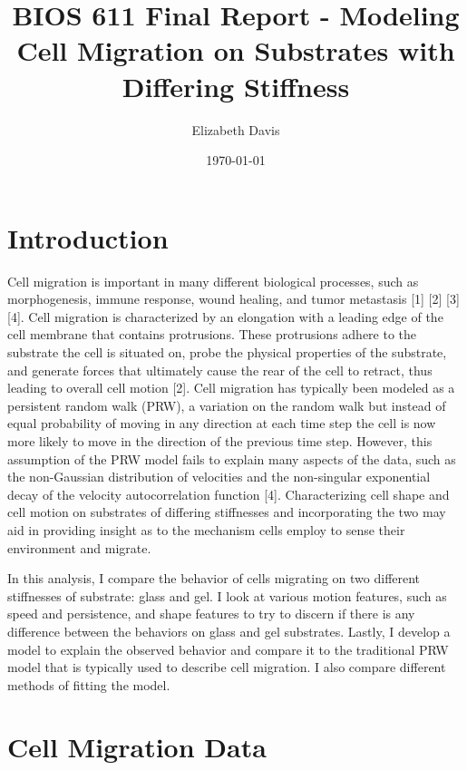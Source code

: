 \documentclass[12pt]{article}
\title{BIOS 611 Final Report - Modeling Cell Migration on Substrates with Differing Stiffness}
\author{Elizabeth Davis}
\date{\today}
\begin{document}
\maketitle

\section{Introduction}

Cell migration is important in many different biological processes, such as morphogenesis, immune response, wound healing, and tumor 
metastasis [1] [2] [3] [4]. 
Cell migration is characterized by an elongation with a leading edge of the cell membrane that contains protrusions. These protrusions
adhere to the substrate the cell is situated on, probe the physical properties of the substrate, and generate forces that ultimately cause 
the rear of the cell to retract, thus leading to overall cell motion [2]. Cell migration has typically been modeled as a persistent 
random walk (PRW), a variation on the random walk but instead of equal probability of moving in any direction at each time step the cell is now more likely to move in the direction of the previous time step.
However, this assumption of the PRW model fails to explain many aspects of the data, such as the non-Gaussian distribution of velocities and the non-singular exponential decay
of the velocity autocorrelation function [4]. Characterizing cell shape and cell motion on substrates of differing stiffnesses and incorporating the two may aid 
in providing insight as to the mechanism cells employ to sense their environment and migrate.

In this analysis, I compare the behavior of cells migrating on two different stiffnesses of substrate: glass and gel. I look at various motion features, such as speed and persistence, and shape features
to try to discern if there is any difference between the behaviors on glass and gel substrates. Lastly,
I develop a model to explain the observed behavior and compare it to the traditional PRW model that is typically used to describe cell migration. I also compare different methods of 
fitting the model.

\section{Cell Migration Data}
\end{document}
